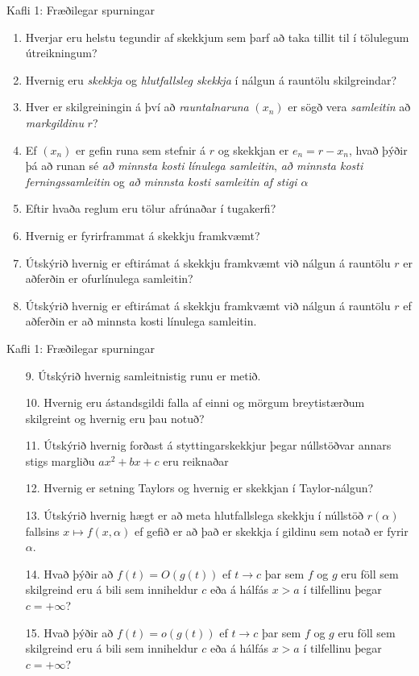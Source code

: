 \begin{frame}{Kafli 1: Fræðilegar spurningar}
  \begin{enumerate}
  \item  Hverjar eru helstu tegundir af skekkjum sem þarf að taka
    tillit til í tölulegum útreikningum?
  \item  Hvernig eru {\it skekkja} og {\it hlutfallsleg skekkja} í nálgun á
    rauntölu skilgreindar?
  \item  Hver er skilgreiningin á því að {\it rauntalnaruna} $(x_n)$
    er sögð vera {\it samleitin} að {\it  markgildinu} $r$?
  \item  Ef $(x_n)$ er gefin runa sem stefnir á $r$ og skekkjan
er  $e_n=r-x_n$, hvað þýðir  þá að runan sé  
{\it  að minnsta kosti línulega samleitin}, 
{\it að minnsta kosti  ferningssamleitin} og  
{\it að minnsta kosti samleitin af stigi $\alpha$} 
  \item  Eftir hvaða reglum eru tölur afrúnaðar í tugakerfi?
  \item  Hvernig er fyrirframmat á skekkju framkvæmt?
  \item  Útskýrið hvernig er eftirámat á skekkju framkvæmt við nálgun á
    rauntölu $r$ er aðferðin er ofurlínulega samleitin?
  \item  Útskýrið hvernig er eftirámat á skekkju framkvæmt við nálgun á
    rauntölu $r$ ef aðferðin er að minnsta kosti línulega samleitin.
   \end{enumerate}
\end{frame}

\begin{frame}{Kafli 1: Fræðilegar spurningar}
  \begin{enumerate}
  \item[9.] Útskýrið hvernig samleitnistig runu er metið.
  \item[10.] Hvernig eru ástandsgildi falla af einni og mörgum
    breytistærðum skilgreint og hvernig eru þau notuð?
  \item[11.] Útskýrið hvernig forðast á styttingarskekkjur þegar
    núllstöðvar annars stigs margliðu $ax^2+bx+c$ eru reiknaðar
  \item[12.]  Hvernig er setning Taylors og hvernig er skekkjan í
    Taylor-nálgun?
  \item[13.]   Útskýrið hvernig hægt er að meta hlutfallslega skekkju
    í núllstöð $r(\alpha)$ fallsins $x\mapsto f(x,\alpha)$ ef gefið er
    að það er skekkja í gildinu sem notað er fyrir $\alpha$. 
  \item[14.]  Hvað þýðir að $f(t) = O(g(t))$ ef $t \rightarrow c$ þar
    sem $f$ og $g$ eru föll sem skilgreind eru á bili sem inniheldur
    $c$ eða á hálfás $x>a$ í tilfellinu þegar $c=+\infty$?
  \item[15.]   Hvað þýðir að $f(t) = o(g(t))$ ef $t \rightarrow c$ þar
    sem $f$ og $g$ eru föll sem skilgreind eru á bili sem inniheldur
    $c$ eða á hálfás $x>a$ í tilfellinu þegar $c=+\infty$?
   \end{enumerate}
\end{frame}

